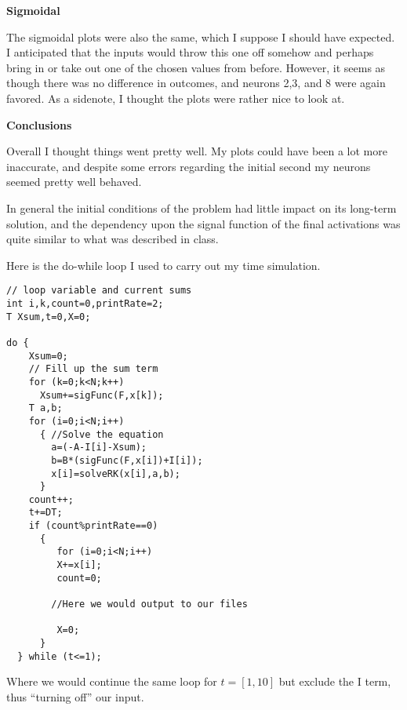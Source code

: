 \documentclass[a4paper,12pt]{article}
\begin{document}
\vfil\eject

\bigskip
{\bf Sigmoidal}
\bigskip

The sigmoidal plots were also the same, which I suppose I should have expected. I anticipated that the inputs would throw this one off somehow and perhaps bring in or take out one of the chosen values from before. However, it seems as though there was no difference in outcomes, and neurons 2,3, and 8 were again favored. As a sidenote, I thought the plots were rather nice to look at. 

\begin{figure}[h!]
\end{figure}

\begin{figure}[h!]
\begin{center}
\end{center}
\end{figure}

\vfil\eject
\bigskip
{\bf Conclusions}
\bigskip

Overall I thought things went pretty well. My plots could have been a lot more inaccurate, and despite some errors regarding the initial second my neurons seemed pretty well behaved. 

\vspace{2mm}

In general the initial conditions of the problem had little impact on its long-term solution, and the dependency upon the signal function of the final activations was quite similar to what was described in class. 

\bigskip
\bigskip
\bigskip
\bigskip
\bigskip
\bigskip
\bigskip
\bigskip
\bigskip
\bigskip
\bigskip
\bigskip
\bigskip
\bigskip
\bigskip
\bigskip
\bigskip
\vfil\eject
Here is the do-while loop I used to carry out my time simulation. 

\bigskip
\begin{verbatim}
// loop variable and current sums
int i,k,count=0,printRate=2;
T Xsum,t=0,X=0;

do {
    Xsum=0;
    // Fill up the sum term
    for (k=0;k<N;k++)
      Xsum+=sigFunc(F,x[k]);
    T a,b;
    for (i=0;i<N;i++)
      { //Solve the equation
        a=(-A-I[i]-Xsum);
        b=B*(sigFunc(F,x[i])+I[i]);
        x[i]=solveRK(x[i],a,b);
      }  
    count++;
    t+=DT;
    if (count%printRate==0)
      {
         for (i=0;i<N;i++)
         X+=x[i];
         count=0;

        //Here we would output to our files

         X=0;
      }
  } while (t<=1); 
\end{verbatim}

Where we would continue the same loop for $t=[1,10]$ but exclude the I term, thus ``turning off'' our input. 
\end{document}
